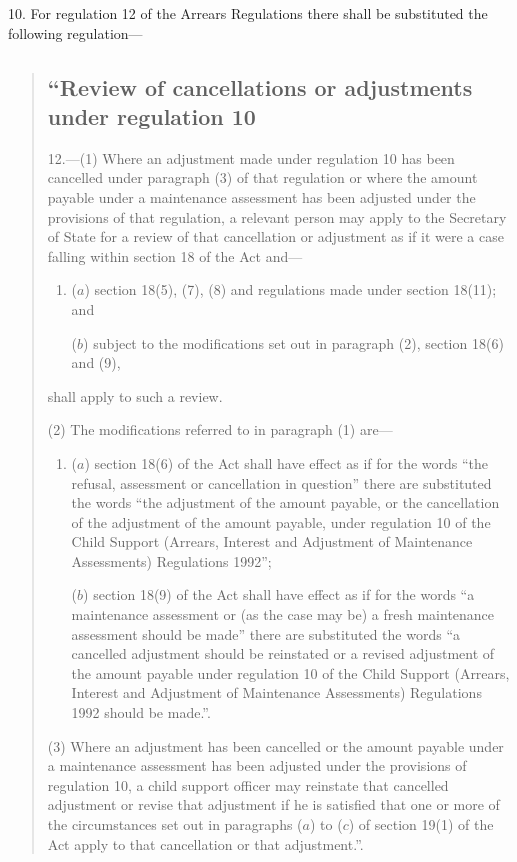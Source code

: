 \documentclass[a4paper]{article}
\begin{document}
10.  For regulation 12 of the Arrears Regulations there shall be substituted the following regulation—
\begin{quotation}
\subsection*{“Review of cancellations or adjustments under regulation 10}

\begin{sloppypar}
12.—(1) Where an adjustment made under regulation 10 has been cancelled under paragraph (3) of that regulation or where the amount payable under a maintenance assessment has been adjusted under the provisions of that regulation, a relevant person may apply to the Secretary of State for a review of that cancellation or adjustment as if it were a case falling within section 18 of the Act and—
\end{sloppypar}
\begin{enumerate}\item[]
($a$) section 18(5), (7), (8) and regulations made under section 18(11); and

($b$) subject to the modifications set out in paragraph (2), section 18(6) and (9),
\end{enumerate}
shall apply to such a review.

(2) The modifications referred to in paragraph (1) are—
\begin{enumerate}\item[]
($a$) section 18(6) of the Act shall have effect as if for the words “the refusal, assessment or cancellation in question” there are substituted the words “the adjustment of the amount payable, or the cancellation of the adjustment of the amount payable, under regulation 10 of the Child Support (Arrears, Interest and Adjustment of Maintenance Assessments) Regulations 1992”;

($b$) section 18(9) of the Act shall have effect as if for the words “a maintenance assessment or (as the case may be) a fresh maintenance assessment should be made” there are substituted the words “a cancelled adjustment should be reinstated or a revised adjustment of the amount payable under regulation 10 of the Child Support (Arrears, Interest and Adjustment of Maintenance Assessments) Regulations 1992 should be made.”.
\end{enumerate}

(3) Where an adjustment has been cancelled or the amount payable under a maintenance assessment has been adjusted under the provisions of regulation 10, a child support officer may reinstate that cancelled adjustment or revise that adjustment if he is satisfied that one or more of the circumstances set out in paragraphs ($a$) to ($c$) of section 19(1) of the Act apply to that cancellation or that adjustment.”.
\end{quotation}
\end{document}
